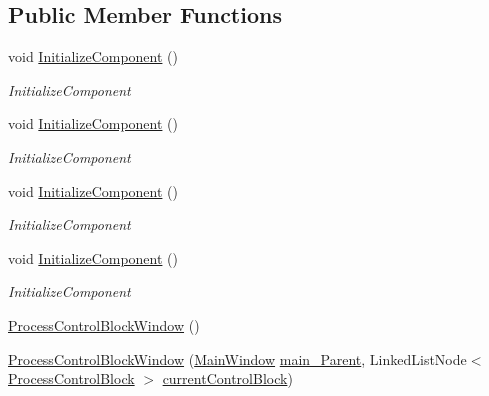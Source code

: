 \subsection*{Public Member Functions}
\begin{DoxyCompactItemize}
\item 
void \hyperlink{class_c_p_u___o_s___simulator_1_1_process_control_block_window_aac333572f064893264da84b178e76404}{Initialize\+Component} ()
\begin{DoxyCompactList}\small\item\em Initialize\+Component \end{DoxyCompactList}\item 
void \hyperlink{class_c_p_u___o_s___simulator_1_1_process_control_block_window_aac333572f064893264da84b178e76404}{Initialize\+Component} ()
\begin{DoxyCompactList}\small\item\em Initialize\+Component \end{DoxyCompactList}\item 
void \hyperlink{class_c_p_u___o_s___simulator_1_1_process_control_block_window_aac333572f064893264da84b178e76404}{Initialize\+Component} ()
\begin{DoxyCompactList}\small\item\em Initialize\+Component \end{DoxyCompactList}\item 
void \hyperlink{class_c_p_u___o_s___simulator_1_1_process_control_block_window_aac333572f064893264da84b178e76404}{Initialize\+Component} ()
\begin{DoxyCompactList}\small\item\em Initialize\+Component \end{DoxyCompactList}\item 
\hyperlink{class_c_p_u___o_s___simulator_1_1_process_control_block_window_afd4e9b7961d1f1c66aa037dba54d39a8}{Process\+Control\+Block\+Window} ()
\item 
\hyperlink{class_c_p_u___o_s___simulator_1_1_process_control_block_window_a4aed66a46265336cfe0cc5293c4e1164}{Process\+Control\+Block\+Window} (\hyperlink{class_c_p_u___o_s___simulator_1_1_main_window}{Main\+Window} \hyperlink{class_c_p_u___o_s___simulator_1_1_process_control_block_window_a928d5159874200e6ca0fad00913d65e5}{main\+\_\+\+Parent}, Linked\+List\+Node$<$ \hyperlink{class_c_p_u___o_s___simulator_1_1_operating___system_1_1_process_control_block}{Process\+Control\+Block} $>$ \hyperlink{class_c_p_u___o_s___simulator_1_1_process_control_block_window_a6019633d26586b0df1c4c2d6f008f6c9}{current\+Control\+Block})

\end{DoxyCompactItemize}

